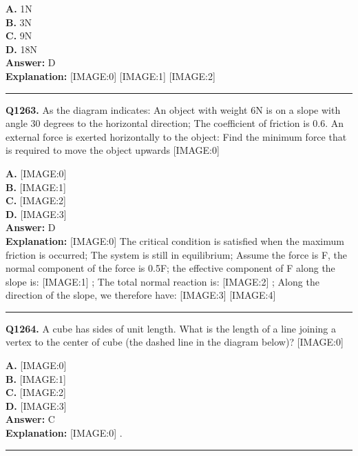 \documentclass[12pt]{article}
\begin{document}
\textbf{A.} 1N \\
\textbf{B.} 3N \\
\textbf{C.} 9N \\
\textbf{D.} 18N \\

\textbf{Answer:} D \\
\textbf{Explanation:} [IMAGE:0]
[IMAGE:1]
[IMAGE:2]

\hrule
\vspace{1em}


\noindent
\textbf{Q1263.} As the diagram indicates: An object with weight 6N is on a slope with angle 30 degrees to the horizontal direction; The coefficient of friction is 0.6. An external force is exerted horizontally to the object: Find the minimum force that is required to move the object upwards
[IMAGE:0]



\textbf{A.} [IMAGE:0] \\
\textbf{B.} [IMAGE:1] \\
\textbf{C.} [IMAGE:2] \\
\textbf{D.} [IMAGE:3] \\

\textbf{Answer:} D \\
\textbf{Explanation:} [IMAGE:0]
The critical condition is satisfied when the maximum friction is occurred; The system is still in equilibrium; Assume the force is F, the normal component of the force is 0.5F; the effective component of F along the slope is:
[IMAGE:1]
; The total normal reaction is:
[IMAGE:2]
; Along the direction of the slope, we therefore have:
[IMAGE:3]
[IMAGE:4]

\hrule
\vspace{1em}


\noindent
\textbf{Q1264.} A cube has sides of unit length. What is the length of a line joining a vertex to the center of cube (the dashed line in the diagram below)?
[IMAGE:0]



\textbf{A.} [IMAGE:0] \\
\textbf{B.} [IMAGE:1] \\
\textbf{C.} [IMAGE:2] \\
\textbf{D.} [IMAGE:3] \\

\textbf{Answer:} C \\
\textbf{Explanation:} [IMAGE:0]
.

\hrule
\vspace{1em}
\end{document}
